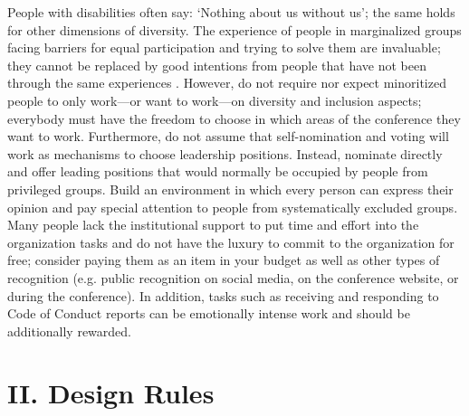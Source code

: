 \documentclass[10pt,letterpaper]{article}
\begin{document}
People with disabilities often say: `Nothing about us without us'; the same holds for other dimensions of diversity. The experience of people in marginalized groups facing barriers for equal participation and trying to solve them are invaluable; they cannot be replaced by good intentions from people that have not been through the same experiences \cite{costanzachockDesign2020}.
However, do not require nor expect minoritized people to only work—or want to work—on diversity and inclusion aspects; 
everybody must have the freedom to choose in which areas of the conference they want to work. 
Furthermore, do not assume that self-nomination and voting will work as mechanisms to choose leadership positions. Instead, nominate directly and offer leading positions that would normally be occupied by people from privileged groups.
Build an environment in which every person can express their opinion and pay special attention to people from systematically excluded groups.
Many people lack the institutional support to put time and effort into the organization tasks and do not have the luxury to commit to the organization for free; consider paying them as an item in your budget as well as other types of recognition (e.g. public recognition on social media, on the conference website, or during the conference).
In addition, tasks such as receiving and responding to Code of Conduct reports can be emotionally intense work and should be additionally rewarded.



\section*{II. Design Rules}
\end{document}
